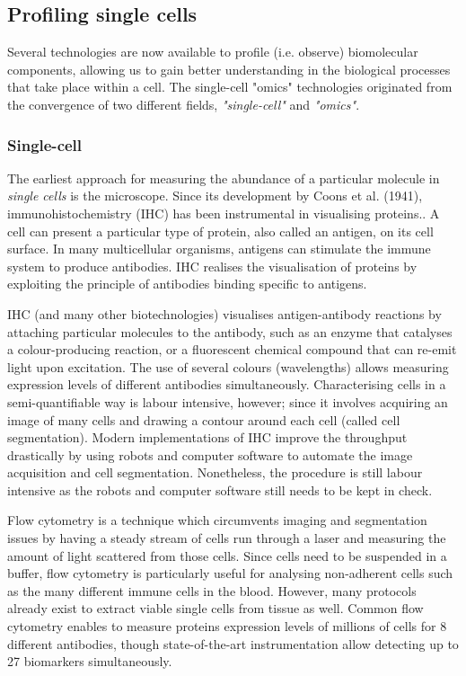 
\subsection{Profiling single cells}
Several technologies are now available to profile (i.e. observe) biomolecular components, allowing us to gain better understanding in the biological processes that take place within a cell. The single-cell "omics" technologies originated from the convergence of two different fields, \emph{"single-cell"} and \emph{"omics"}.

\subsubsection{Single-cell}
The earliest approach for measuring the abundance of a particular molecule in \emph{single cells} is the microscope.
Since its development by Coons et al. (1941), immunohistochemistry (IHC) has been instrumental in visualising proteins.\cite{coons_immunologicalpropertiesantibody_1941}. 
A cell can present a particular type of protein, also called an antigen, on its cell surface. In many multicellular organisms, antigens can stimulate the immune system to produce antibodies. IHC realises the visualisation of proteins by exploiting the principle of antibodies binding specific to antigens.

IHC (and many other biotechnologies) visualises antigen-antibody reactions by attaching particular molecules to the antibody, such as an enzyme that catalyses a colour-producing reaction, or a fluorescent chemical compound that can re-emit light upon excitation. The use of several colours (wavelengths) allows measuring expression levels of different antibodies simultaneously. Characterising cells in a semi-quantifiable way is labour intensive, however; since it involves acquiring an image of many cells and drawing a contour around each cell (called cell segmentation).
Modern implementations of IHC improve the throughput drastically by using robots and computer software to automate the image acquisition and cell segmentation. Nonetheless, the procedure is still labour intensive as the robots and computer software still needs to be kept in check.

Flow cytometry\cite{fulwyler_electronicseparationbiological_1965} is a technique which circumvents imaging and segmentation issues by having a steady stream of cells run through a laser and measuring the amount of light scattered from those cells. 
Since cells need to be suspended in a buffer, flow cytometry is particularly useful for analysing non-adherent cells such as the many different immune cells in the blood. However, many protocols already exist to extract viable single cells from tissue as well\cite{leelatian_preparingviablesingle_2017}.
Common flow cytometry enables to measure proteins expression levels of millions of cells for 8 different antibodies, though state-of-the-art instrumentation allow detecting up to 27 biomarkers simultaneously\cite{cossarizza_guidelinesuseflow_2017}.

